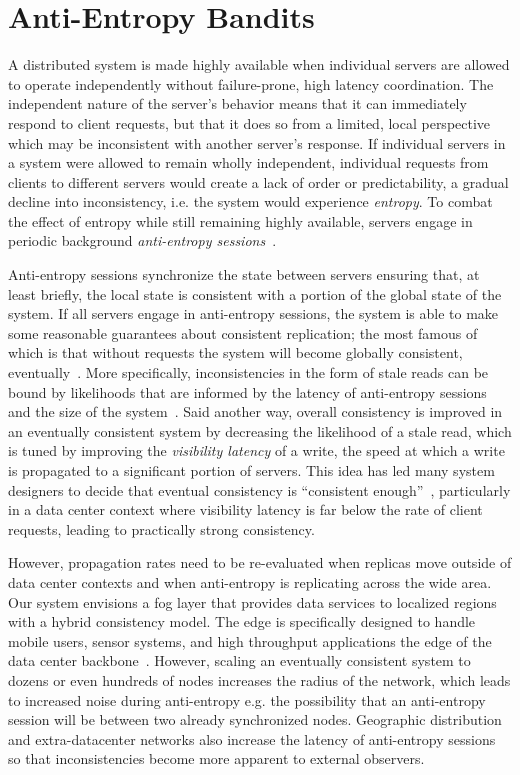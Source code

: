 \section{Anti-Entropy Bandits}

A distributed system is made highly available when individual servers are
allowed to operate independently without failure-prone, high latency
coordination.
The independent nature of the server's behavior means that it can immediately
respond to client requests, but that it does so from a limited, local
perspective which may be inconsistent with another server's response.
If individual servers in a system were allowed to remain wholly independent,
individual requests from clients to different servers would create a lack of
order or predictability, a gradual decline into inconsistency, i.e. the
system would experience \textit{entropy}.
To combat the effect of entropy while still remaining highly available,
servers engage in periodic background \textit{anti-entropy
  sessions}~\cite{bayou}.

Anti-entropy sessions synchronize the state between servers ensuring that,
at least briefly, the local state is consistent with a portion of the global
state of the system.
If all servers engage in anti-entropy sessions, the system is able to make
some reasonable guarantees about consistent replication; the most famous
of which is that without requests the system will become
globally consistent, eventually~\cite{anti_entropy}.
More specifically, inconsistencies in the form of stale reads can be bound by
likelihoods that are informed by the latency of anti-entropy sessions and the
size of the system~\cite{probabilistically_bounded_staleness,quantifying_pbs}.
Said another way, overall consistency is improved in an eventually consistent
system by decreasing the likelihood of a stale read, which is tuned by
improving the \textit{visibility latency} of a write, the speed at which a
write is propagated to a significant portion of servers.
This idea has led many system designers to decide that eventual consistency
is ``consistent enough''~\cite{bermbach_eventual_2011,wada_data_2011},
particularly in a data center context where visibility latency is far below
the rate of client requests, leading to practically strong consistency.

However, propagation rates need to be re-evaluated when replicas move outside of data center contexts and when anti-entropy is replicating across the wide area.
Our system envisions a fog layer that provides data services to localized regions with a hybrid consistency model.
The edge is specifically designed to handle mobile users, sensor systems, and high throughput applications the edge of the data center backbone~\cite{edge_computing,geo_cdn}.
However, scaling an eventually consistent system to dozens or even hundreds
of nodes increases the radius of the network, which leads to increased noise
during anti-entropy e.g. the possibility that an anti-entropy session will be
between two already synchronized nodes.
Geographic distribution and extra-datacenter networks also increase the
latency of anti-entropy sessions so that inconsistencies become more apparent
to external observers.

